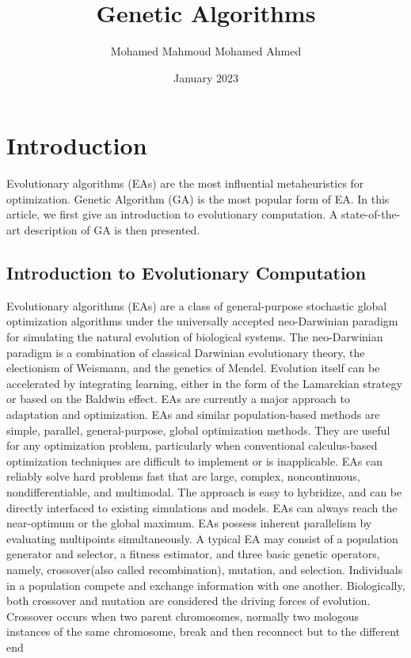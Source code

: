 \documentclass[14pt]{article}
\title{Genetic Algorithms}
\author{Mohamed Mahmoud Mohamed Ahmed}
\date{January 2023}
\numberwithin{equation}{subsection}
\begin{document}
\maketitle

\newpage

\section{Introduction}
Evolutionary algorithms (EAs) are the most influential metaheuristics 
for optimization. Genetic Algorithm (GA) is the most popular form of EA. In this article, we first give an introduction to evolutionary computation. 
A state-of-the-art description of GA is then presented.
    \subsection{Introduction to Evolutionary Computation}
    Evolutionary algorithms (EAs) are a class of general-purpose stochastic global optimization algorithms under
		the universally accepted neo-Darwinian paradigm for simulating the natural evolution of biological systems.
		The neo-Darwinian paradigm is a combination of classical Darwinian evolutionary theory, the electionism of
		Weismann, and the genetics of Mendel. Evolution itself can be accelerated by integrating learning, either in
		the form of the Lamarckian strategy or based on the Baldwin effect. EAs are currently a major approach to
		adaptation and optimization. EAs and similar population-based methods are simple, parallel, general-purpose,
		global optimization methods. They are useful for any optimization problem, particularly when conventional
		calculus-based optimization techniques are difficult to implement or is inapplicable. EAs can reliably solve
		hard problems fast that are large, complex, noncontinuous, nondifferentiable, and multimodal. The approach is
		easy to hybridize, and can be directly interfaced to existing simulations and models. EAs can always reach
		the near-optimum or the global maximum. EAs possess inherent parallelism by evaluating multipoints
		simultaneously. A typical EA may consist of a population generator and selector, a fitness estimator, and
		three basic genetic operators, namely, crossover(also called recombination), mutation, and selection.
		Individuals in a population compete and exchange information with one another. Biologically, both crossover
		and mutation are considered the driving forces of evolution. Crossover occurs when two parent chromosomes,
		normally two mologous instances of the same chromosome, break and then reconnect but to the different end
\end{document}
